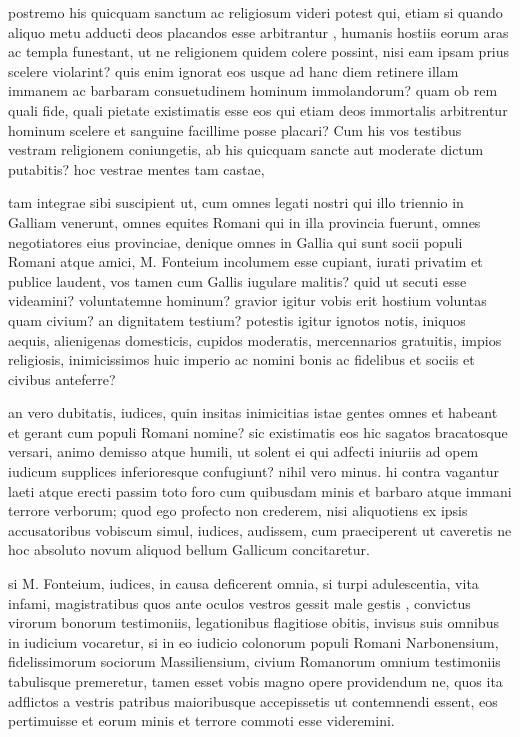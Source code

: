  postremo his quicquam sanctum ac religiosum videri potest qui, etiam si quando aliquo metu adducti deos placandos esse arbitrantur , humanis hostiis eorum aras ac templa funestant, ut ne religionem quidem colere possint, nisi eam ipsam prius scelere violarint? quis enim ignorat eos usque ad hanc diem retinere illam immanem ac barbaram consuetudinem hominum immolandorum? quam ob rem quali fide, quali pietate existimatis esse eos qui etiam deos immortalis arbitrentur hominum scelere et sanguine facillime posse placari? Cum his vos testibus vestram religionem coniungetis, ab his quicquam sancte aut moderate dictum putabitis? hoc vestrae mentes tam castae,

 tam integrae sibi suscipient ut, cum omnes legati nostri qui illo triennio in Galliam venerunt, omnes equites Romani qui in illa provincia fuerunt, omnes negotiatores eius provinciae, denique omnes in Gallia qui sunt socii populi Romani atque amici, M. Fonteium incolumem esse cupiant, iurati privatim et publice laudent, vos tamen cum Gallis iugulare malitis? quid ut secuti esse videamini? voluntatemne hominum? gravior igitur vobis erit hostium voluntas quam civium? an dignitatem testium? potestis igitur ignotos notis, iniquos aequis, alienigenas domesticis, cupidos moderatis, mercennarios gratuitis, impios religiosis, inimicissimos huic imperio ac nomini bonis ac fidelibus et sociis et civibus anteferre?

 an vero dubitatis, iudices, quin insitas inimicitias istae gentes omnes et habeant et gerant cum populi Romani nomine? sic existimatis eos hic sagatos bracatosque versari, animo demisso atque humili, ut solent ei qui adfecti iniuriis ad opem iudicum supplices inferioresque confugiunt? nihil vero minus. hi contra vagantur laeti atque erecti passim toto foro cum quibusdam minis et barbaro atque immani terrore verborum; quod ego profecto non crederem, nisi aliquotiens ex ipsis accusatoribus vobiscum simul, iudices, audissem, cum praeciperent ut caveretis ne hoc absoluto novum aliquod bellum Gallicum concitaretur.

 si M. Fonteium, iudices, in causa deficerent omnia, si turpi adulescentia, vita infami, magistratibus quos ante oculos vestros gessit male gestis , convictus virorum bonorum testimoniis, legationibus flagitiose obitis, invisus suis omnibus in iudicium vocaretur, si in eo iudicio colonorum populi Romani Narbonensium, fidelissimorum sociorum Massiliensium, civium Romanorum omnium testimoniis tabulisque premeretur, tamen esset vobis magno opere providendum ne, quos ita adflictos a vestris patribus maioribusque accepissetis ut contemnendi essent, eos pertimuisse et eorum minis et terrore commoti esse videremini.

